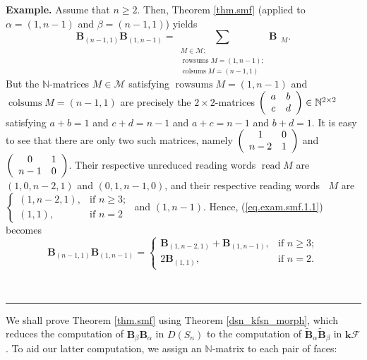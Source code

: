 \documentclass[12pt]{article}
\theoremstyle{definition}%
\theoremstyle{definition}%
\newtheorem{exmp}[thm]{Example}
\theoremstyle{remark}%
\newcommand{\kk}{\mathbf{k}}
\newcommand{\kf}{\kk\mathcal{F}}
\newcommand{\dsn}{D\left(S_n\right)}
\newcommand{\BB}{\mathbf{B}}
\newcommand{\BBt}{\widetilde{\mathbf{B}}}
\newcommand{\CM}{\mathcal{M}}
\newcommand{\rowsums}{\operatorname{rowsums}}
\newcommand{\colsums}{\operatorname{colsums}}
\newcommand{\readw}{\operatorname{read}}
\newcommand{\readb}{\mathop{\overline{\operatorname{read}}}}
\newenvironment{exmp}[1][Example]{\noindent\textbf{#1.} }{\ \rule{0.5em}{0.5em}}
\begin{document}
\begin{exmp}
\label{exam.smf.1}Assume that $n\geq2$. Then, Theorem \ref{thm.smf} (applied
to $\alpha=\left(  1,n-1\right)  $ and $\beta=\left(  n-1,1\right)  $) yields
\begin{equation}
\BB_{\left(  n-1,1\right)  }\BB_{\left(  1,n-1\right)  }
=\sum_{\substack{M\in\CM;\\\rowsums M=\left(
1,n-1\right)  ;\\\colsums M=\left(  n-1,1\right)  }}
\BB_{\readb M}.
\label{eq.exam.smf.1.1}
\end{equation}
But the $\mathbb{N}$-matrices $M\in\CM$ satisfying
$\rowsums M=\left(  1,n-1\right)  $ and $\colsums M
=\left(  n-1,1\right)  $ are precisely the $2\times2$-matrices
$\left(  \begin{array}[c]{cc}
a & b\\
c & d
\end{array}
\right)  \in\mathbb{N}^{2\times2}$ satisfying $a+b=1$ and $c+d=n-1$ and
$a+c=n-1$ and $b+d=1$. It is easy to see that there are only two such
matrices, namely $\left(
\begin{array}[c]{cc}
1 & 0\\
n-2 & 1
\end{array}
\right)  $ and $\left(
\begin{array}[c]{cc}
0 & 1\\
n-1 & 0
\end{array}
\right)  $. Their respective unreduced reading words $\readw M$
are $\left(  1,0,n-2,1\right)  $ and $\left(  0,1,n-1,0\right)  $, and their
respective reading words $\readb M$ are $
\begin{cases}
\left(  1,n-2,1\right)  , & \text{if }n\geq3;\\
\left(  1,1\right)  , & \text{if }n=2
\end{cases}
$ and $\left(  1,n-1\right)  $. Hence, (\ref{eq.exam.smf.1.1}) becomes
\[
\BB_{\left(  n-1,1\right)  }\BB_{\left(  1,n-1\right)  }=
\begin{cases}
\BB_{\left(  1,n-2,1\right)  }+\BB_{\left(  1,n-1\right)  }, &
\text{if }n\geq3;\\
2\BB_{\left(  1,1\right)  }, & \text{if }n=2.
\end{cases}
\]

\end{exmp}

We shall prove Theorem \ref{thm.smf} using Theorem \ref{dsn_kfsn_morph}, which
reduces the computation of $\BB_{\beta}\BB_{\alpha}$ in
$\dsn$ to the computation of
$\BBt_{\alpha}\BBt_{\beta}$ in $\kf$. To aid
our latter computation, we assign an $\mathbb{N}$-matrix to each pair of faces:
\end{document}
